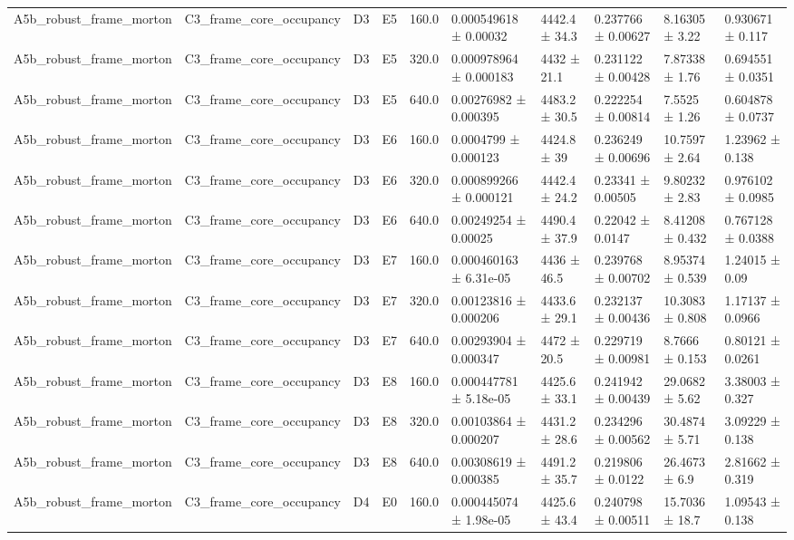 \begin{table}
\begin{tabular}{llllllllll}
A5b\_robust\_frame\_morton & C3\_frame\_core\_occupancy & D3 & E5 & 160.0 & 0.000549618 ± 0.00032 & 4442.4 ± 34.3 & 0.237766 ± 0.00627 & 8.16305 ± 3.22 & 0.930671 ± 0.117 \\
A5b\_robust\_frame\_morton & C3\_frame\_core\_occupancy & D3 & E5 & 320.0 & 0.000978964 ± 0.000183 & 4432 ± 21.1 & 0.231122 ± 0.00428 & 7.87338 ± 1.76 & 0.694551 ± 0.0351 \\
A5b\_robust\_frame\_morton & C3\_frame\_core\_occupancy & D3 & E5 & 640.0 & 0.00276982 ± 0.000395 & 4483.2 ± 30.5 & 0.222254 ± 0.00814 & 7.5525 ± 1.26 & 0.604878 ± 0.0737 \\
A5b\_robust\_frame\_morton & C3\_frame\_core\_occupancy & D3 & E6 & 160.0 & 0.0004799 ± 0.000123 & 4424.8 ± 39 & 0.236249 ± 0.00696 & 10.7597 ± 2.64 & 1.23962 ± 0.138 \\
A5b\_robust\_frame\_morton & C3\_frame\_core\_occupancy & D3 & E6 & 320.0 & 0.000899266 ± 0.000121 & 4442.4 ± 24.2 & 0.23341 ± 0.00505 & 9.80232 ± 2.83 & 0.976102 ± 0.0985 \\
A5b\_robust\_frame\_morton & C3\_frame\_core\_occupancy & D3 & E6 & 640.0 & 0.00249254 ± 0.00025 & 4490.4 ± 37.9 & 0.22042 ± 0.0147 & 8.41208 ± 0.432 & 0.767128 ± 0.0388 \\
A5b\_robust\_frame\_morton & C3\_frame\_core\_occupancy & D3 & E7 & 160.0 & 0.000460163 ± 6.31e-05 & 4436 ± 46.5 & 0.239768 ± 0.00702 & 8.95374 ± 0.539 & 1.24015 ± 0.09 \\
A5b\_robust\_frame\_morton & C3\_frame\_core\_occupancy & D3 & E7 & 320.0 & 0.00123816 ± 0.000206 & 4433.6 ± 29.1 & 0.232137 ± 0.00436 & 10.3083 ± 0.808 & 1.17137 ± 0.0966 \\
A5b\_robust\_frame\_morton & C3\_frame\_core\_occupancy & D3 & E7 & 640.0 & 0.00293904 ± 0.000347 & 4472 ± 20.5 & 0.229719 ± 0.00981 & 8.7666 ± 0.153 & 0.80121 ± 0.0261 \\
A5b\_robust\_frame\_morton & C3\_frame\_core\_occupancy & D3 & E8 & 160.0 & 0.000447781 ± 5.18e-05 & 4425.6 ± 33.1 & 0.241942 ± 0.00439 & 29.0682 ± 5.62 & 3.38003 ± 0.327 \\
A5b\_robust\_frame\_morton & C3\_frame\_core\_occupancy & D3 & E8 & 320.0 & 0.00103864 ± 0.000207 & 4431.2 ± 28.6 & 0.234296 ± 0.00562 & 30.4874 ± 5.71 & 3.09229 ± 0.138 \\
A5b\_robust\_frame\_morton & C3\_frame\_core\_occupancy & D3 & E8 & 640.0 & 0.00308619 ± 0.000385 & 4491.2 ± 35.7 & 0.219806 ± 0.0122 & 26.4673 ± 6.9 & 2.81662 ± 0.319 \\
A5b\_robust\_frame\_morton & C3\_frame\_core\_occupancy & D4 & E0 & 160.0 & 0.000445074 ± 1.98e-05 & 4425.6 ± 43.4 & 0.240798 ± 0.00511 & 15.7036 ± 18.7 & 1.09543 ± 0.138 \\

\end{tabular}
\end{table}
